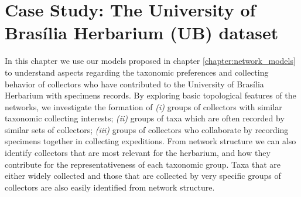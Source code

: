 \chapter{Case Study: The University of Brasília Herbarium (UB) dataset}\label{casestudy_ub}


In this chapter we use our models proposed in chapter \ref{chapter:network_models} to understand aspects regarding the taxonomic preferences and collecting behavior of collectors who have contributed to the University of Brasília Herbarium with specimens records.
By exploring basic topological features of the networks, we investigate the formation of
\textit{(i)} groups of collectors with similar taxonomic collecting interests;
\textit{(ii)} groups of taxa which are often recorded by similar sets of collectors;
\textit{(iii)} groups of collectors who collaborate by recording specimens together in collecting expeditions. 
From network structure we can also identify collectors that are most relevant for the herbarium, and how they contribute for the representativeness of each taxonomic group.
Taxa that are either widely collected and those that are collected by very specific groups of collectors are also easily identified from network structure.

